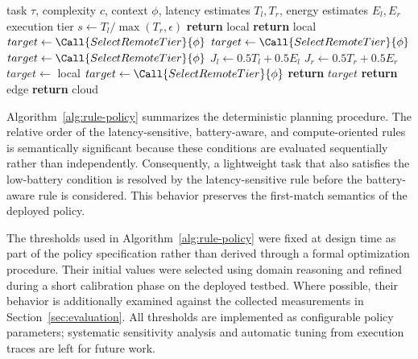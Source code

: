 \begin{algorithm}[t]
\caption{Deterministic task-placement procedure used during the planning phase.}
\label{alg:rule-policy}
\begin{algorithmic}[1]
\Require task $\tau$, complexity $c$, context $\phi$, latency estimates $T_l,T_r$, energy estimates $E_l,E_r$
\Ensure execution tier
\State $s \gets T_l/\max(T_r,\epsilon)$
    \State \textbf{return} local
\EndIf
{}
    \State \textbf{return} local
\EndIf
{}
    \State $target \gets \Call{SelectRemoteTier}{\phi}$
    \State $target \gets \Call{SelectRemoteTier}{\phi}$
    \State $target \gets \Call{SelectRemoteTier}{\phi}$
\Else
    \State $J_l \gets 0.5T_l+0.5E_l$
    \State $J_r \gets 0.5T_r+0.5E_r$
        \State $target \gets$ local
    \Else
        \State $target \gets \Call{SelectRemoteTier}{\phi}$
    \EndIf
\EndIf
\State \textbf{return} $target$
        \State \textbf{return} edge
    \Else
        \State \textbf{return} cloud
    \EndIf
\EndFunction
\end{algorithmic}
\end{algorithm}

Algorithm~\ref{alg:rule-policy} summarizes the deterministic planning procedure.
The relative order of the latency-sensitive, battery-aware, and compute-oriented
rules is semantically significant because these conditions are evaluated
sequentially rather than independently. Consequently, a lightweight task that
also satisfies the low-battery condition is resolved by the latency-sensitive
rule before the battery-aware rule is considered. This behavior preserves the
first-match semantics of the deployed policy.

The thresholds used in Algorithm~\ref{alg:rule-policy} were fixed at design
time as part of the policy specification rather than derived through a formal
optimization procedure. Their initial values were selected using domain
reasoning and refined during a short calibration phase on the deployed
testbed. Where possible, their behavior is additionally examined against the
collected measurements in Section~\ref{sec:evaluation}. All thresholds are
implemented as configurable policy parameters; systematic sensitivity analysis
and automatic tuning from execution traces are left for future work.

